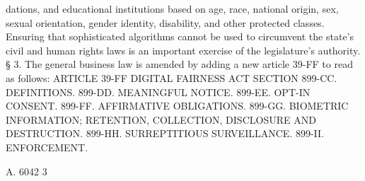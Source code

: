  dations,  and  educational  institutions  based  on  age, race, national
 origin, sex, sexual orientation, gender identity, disability, and  other
 protected classes. Ensuring that sophisticated algorithms cannot be used
 to  circumvent  the  state's civil and human rights laws is an important
 exercise of the legislature's authority.
   § 3. The general business law is amended by adding a new article 39-FF
 to read as follows:
                               ARTICLE 39-FF
                           DIGITAL FAIRNESS ACT
 SECTION 899-CC. DEFINITIONS.
         899-DD. MEANINGFUL NOTICE.
         899-EE. OPT-IN CONSENT.
         899-FF. AFFIRMATIVE OBLIGATIONS.
         899-GG. BIOMETRIC INFORMATION; RETENTION, COLLECTION, DISCLOSURE
                   AND DESTRUCTION.
         899-HH. SURREPTITIOUS SURVEILLANCE.
         899-II. ENFORCEMENT.

 A. 6042                             3
 
